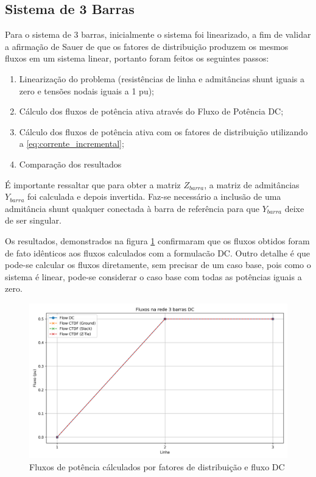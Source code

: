 \documentclass[journal]{IEEEtran}
\begin{document}
\subsection{Sistema de 3 Barras}
Para o sistema de 3 barras, inicialmente o sistema foi linearizado, a fim de validar a afirmação de Sauer de que os fatores de distribuição produzem os mesmos fluxos em um sistema linear, portanto foram feitos os seguintes passos:
\begin{enumerate}
  \item Linearização do problema (resistências de linha e admitâncias shunt iguais a zero e tensões nodais iguais a 1 pu);
  \item Cálculo dos fluxos de potência ativa através do Fluxo de Potência DC;
  \item Cálculo dos fluxos de potência ativa com os fatores de distribuição utilizando a \eqref{eq:corrente_incremental};
  \item Comparação dos resultados
\end{enumerate}
É importante ressaltar que para obter a matriz $Z_{barra}$, a matriz de admitâncias $Y_{barra}$ foi calculada e depois invertida. Faz-se necessário a inclusão de uma admitância shunt qualquer conectada à barra de referência para que $Y_{barra}$ deixe de ser singular. 

Os resultados, demonstrados na figura \ref{fig:fluxo_3bus_dc} confirmaram que os fluxos obtidos foram de fato idênticos aos fluxos calculados com a formulacão DC. Outro detalhe é que pode-se calcular os fluxos diretamente, sem precisar de um caso base, pois como o sistema é linear, pode-se considerar o caso base com todas as potências iguais a zero.

\begin{figure}[H]
\centering
\includegraphics[width=1.0\linewidth]{../images/fluxos_3bus_DC.png}
\caption{Fluxos de potência cálculados por fatores de distribuição e fluxo DC}
\label{fig:fluxo_3bus_dc}
\end{figure}
\end{document}
